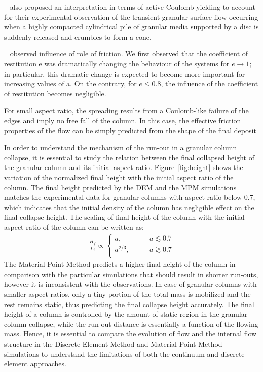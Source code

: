 ~\citet{Daerr1999} also proposed an interpretation in terms
of active Coulomb yielding to account for their experimental
observation of the transient granular surface flow occurring
when a highly compacted cylindrical pile of granular media
supported by a disc is suddenly released and crumbles to
form a cone.

~\citet{Staron2006a} observed influence of role of friction. We first observed 
that the coefficient of restitution e was dramatically changing the behaviour 
of the systems for $e\longrightarrow 1$; in particular, this dramatic change is 
expected to become more important for increasing values of a. On the contrary, 
for $e \le 0.8$, the influence of the coefficient of restitution becomes 
negligible.

For small aspect ratio, the spreading results from a Coulomb-like
failure of the edges and imply no free fall of the column. In this case, the 
effective friction properties of the flow can be simply predicted from the 
shape of the final deposit

In order to understand the mechanism of the run-out in a granular column 
collapse, it is essential to study the relation between the final collapsed 
height of the granular column and its initial aspect ratio. 
Figure~\ref{fig:height} shows the variation of the normalized final height with 
the initial aspect ratio of the column. The final height predicted by the 
DEM and the MPM simulations matches the experimental data 
for 
granular columns with aspect ratio below 0.7, which indicates that the initial 
density of the column has negligible effect on the final collapse height. The 
scaling of final height of the column with the initial aspect ratio of the 
column can be written as:
\begin{align}
\frac{H_{\textit{f}}}{L_{\textit{i}}} \propto  
\begin{cases}
\textit{a}, \qquad & \textit{a}\lesssim0.7 \\
\textit{a}^{2/3}, \qquad & \textit{a}\gtrsim0.7 \\
\end{cases}
\end{align}
The Material Point Method predicts a higher final height of the column in 
comparison with the particular simulations that should result in shorter 
run-outs, however it is inconsistent with the observations. In case of granular 
columns with smaller aspect ratios, only a tiny portion of the total mass is 
mobilized and the rest remains static, thus predicting the final collapse 
height accurately. The final height of a column is controlled by the amount of 
static region in the granular column collapse, while the run-out distance is 
essentially a function of the flowing mass. Hence, it is essential to compare 
the evolution of flow and the internal flow structure in the Discrete Element 
Method 
and Material Point Method simulations to understand the limitations of both the 
continuum and discrete element approaches.

